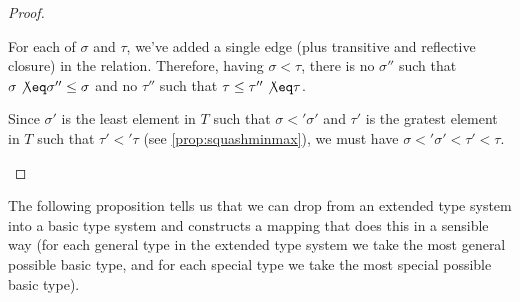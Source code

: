 \documentclass[main.tex]{subfiles}
\begin{document}
\begin{proof}
\begin{itemize}
\begin{itemize}
                    For each of $\sigma$ and $\tau$, we've added a single edge
                    (plus transitive and reflective closure) in the relation.
                    Therefore, having $\sigma \less \tau$, there is no
                    $\sigma''$ such that $\sigma \not\eq \sigma'' \less \sigma$
                    and no $\tau''$ such that $\tau \less \tau'' \not\eq \tau$.

                    Since $\sigma'$ is the least element in $T$ such that
                    $\sigma \less' \sigma'$  and $\tau'$
                    is the gratest element in $T$
                    such that $\tau' \less' \tau$ (see \cref{prop:squashminmax}),
                    we must have
                    $\sigma \less' \sigma' \less \tau' \less \tau$.
            \end{itemize}
    \end{itemize}
\end{proof}

The following proposition tells us that we can drop from an extended type
system into a basic type system and constructs a mapping that does this in a
sensible way (for each general type in the extended type system we take the
most general possible basic type, and for each special type we take the most
special possible basic type).
\end{document}
